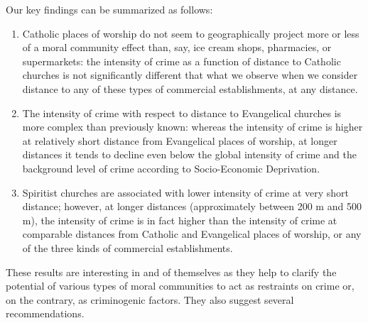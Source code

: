 \documentclass[smallextended]{svjour3}       %
\begin{document}
Our key findings can be summarized as follows:

\begin{enumerate}
\def\labelenumi{\arabic{enumi}.}
\item
  Catholic places of worship do not seem to geographically project more
  or less of a moral community effect than, say, ice cream shops,
  pharmacies, or supermarkets: the intensity of crime as a function of
  distance to Catholic churches is not significantly different that what
  we observe when we consider distance to any of these types of
  commercial establishments, at any distance.
\item
  The intensity of crime with respect to distance to Evangelical
  churches is more complex than previously known: whereas the intensity
  of crime is higher at relatively short distance from Evangelical
  places of worship, at longer distances it tends to decline even below
  the global intensity of crime and the background level of crime
  according to Socio-Economic Deprivation.
\item
  Spiritist churches are associated with lower intensity of crime at
  very short distance; however, at longer distances (approximately
  between 200 m and 500 m), the intensity of crime is in fact higher
  than the intensity of crime at comparable distances from Catholic and
  Evangelical places of worship, or any of the three kinds of commercial
  establishments.
\end{enumerate}

These results are interesting in and of themselves as they help to
clarify the potential of various types of moral communities to act as
restraints on crime or, on the contrary, as criminogenic factors. They
also suggest several recommendations.
\end{document}
